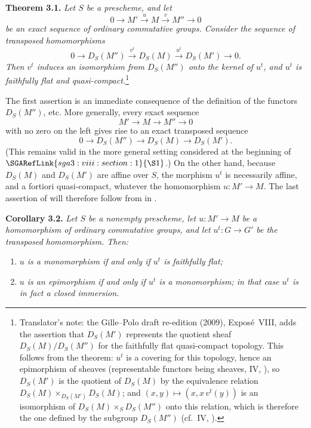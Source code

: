 \medskip
\noindent{}\textbf{Theorem 3.1.}
\textit{Let \(S\) be a prescheme, and let}
\[
  0\longrightarrow M'
   \xrightarrow{u}M
   \xrightarrow{v}M''
   \longrightarrow0
\]
\textit{be an exact sequence of ordinary commutative groups. Consider the
sequence of transposed homomorphisms}
\[
  0\longrightarrow D_S(M'')
   \xrightarrow{v^t}D_S(M)
   \xrightarrow{u^t}D_S(M')
   \longrightarrow0.
\]
\textit{Then \(v^t\) induces an isomorphism from \(D_S(M'')\) onto the
kernel of \(u^t\), and \(u^t\) is faithfully flat and quasi-compact.}\footnote{Translator's
note: the Gille--Polo draft re-edition (2009), Expos\'e~VIII, adds the assertion that \(D_S(M')\)
represents the quotient sheaf \(D_S(M)/D_S(M'')\) for the faithfully flat quasi-compact topology.
This follows from the theorem: \(u^t\) is a covering for this topology, hence an epimorphism of
sheaves (representable functors being sheaves, IV,
), so \(D_S(M')\) is the quotient of
\(D_S(M)\) by the equivalence relation \(D_S(M)\times_{D_S(M')}D_S(M)\); and
\((x,y)\mapsto(x,x\,v^t(y))\) is an isomorphism of \(D_S(M)\times_SD_S(M'')\) onto this
relation, which is therefore the one defined by the subgroup \(D_S(M'')\) (cf.\ IV,
).}

The first assertion is an immediate consequence of the definition of the
functors \(D_S(M'')\), etc. More generally,
every exact sequence
\[
  M'\longrightarrow M\longrightarrow M''\longrightarrow0
\]
with no zero on the left gives rise to an exact transposed sequence
\[
  0\longrightarrow D_S(M'')
   \longrightarrow D_S(M)
   \longrightarrow D_S(M').
\]
(This remains valid in the more general setting considered at the
beginning of \(\SGARefLink{sga3:viii:section:1}{\S1}\).) On the other hand, because \(D_S(M)\) and
\(D_S(M')\) are affine over \(S\), the morphism \(u^t\) is necessarily
affine, and a fortiori quasi-compact, whatever the homomorphism
\(u:M'\to M\). The last assertion of 
will therefore follow from 
in .

\medskip
\noindent{}\textbf{Corollary 3.2.}
\textit{Let \(S\) be a nonempty prescheme, let \(u:M'\to M\) be a
homomorphism of ordinary commutative groups, and let
\(u^t:G\to G'\) be the transposed homomorphism. Then:}
\begin{enumerate}
  \item[(a)]
  \textit{\(u\) is a monomorphism if and only if \(u^t\) is faithfully
  flat;}

  \item[(b)]
  \textit{\(u\) is an epimorphism if and only if \(u^t\) is a
  monomorphism; in that case \(u^t\) is in fact a closed immersion.}
\end{enumerate}

